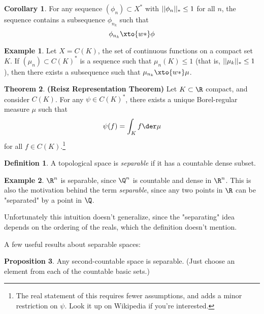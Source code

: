 \documentclass[a5paper]{article}
\theoremstyle{definition}%
\newtheorem{theorem}{Theorem}
\newtheorem{corollary}[theorem]{Corollary}
\newtheorem{proposition}[theorem]{Proposition}
\newtheorem*{definition*}{Definition}
\newtheorem*{example*}{Example}
\numberwithin{exercise}{section}
\theoremstyle{remark}%
\begin{document}
\begin{highlight}
\begin{corollary}
For any sequence $(\phi_n)\subset X^*$ with $\norm{\phi_n}_*\leq1$ for all $n$,  the sequence contains a subsequence $\phi_{n_k}$ such that 
$$\phi_{n_k}\xto{w*}\phi$$
\end{corollary}
\end{highlight}

\begin{example*}
Let $X=C(K)$, the set of continuous functions on a compact set $K$. If $(\mu_n)\subset C(K)^*$ is a sequence such that $\mu_n(K)\leq 1$ (that is, $||\mu_k||_*\leq1$), then there exists a subsequence such that $\mu_{n_k}\xto{w*}\mu$. 
\end{example*}

\begin{highlight}
\begin{theorem}\textbf{(Reisz Representation Theorem)}
Let $K\subset\R$ compact, and consider $C(K)$. For any $\psi\in C(K)^*$, there exists a unique Borel-regular measure $\mu$ such that 
$$\psi(f)=\int_K f \der\mu$$
for all $f\in C(K)$.\footnote{The real statement of this requires fewer assumptions, and adds a minor restriction on $\psi$. Look it up on Wikipedia if you're interested.}
\end{theorem}
\end{highlight}

\begin{highlight}
\begin{definition*}
A topological space is \emph{separable} if it has a countable dense subset. 
\end{definition*}
\end{highlight}

\begin{example*}
$\R^n$ is separable, since $\Q^n$ is countable and dense in $\R^n$. This is also the motivation behind the term \textit{separable}, since any two points in $\R$ can be "separated" by a point in $\Q$. 

Unfortunately this intuition doesn't generalize, since the "separating" idea depends on the ordering of the reals, which the definition doesn't mention. 
\end{example*}

A few useful results about separable spaces:

\begin{proposition}
Any second-countable space is separable. (Just choose an element from each of the countable basic sets.)
\end{proposition}
\end{document}
